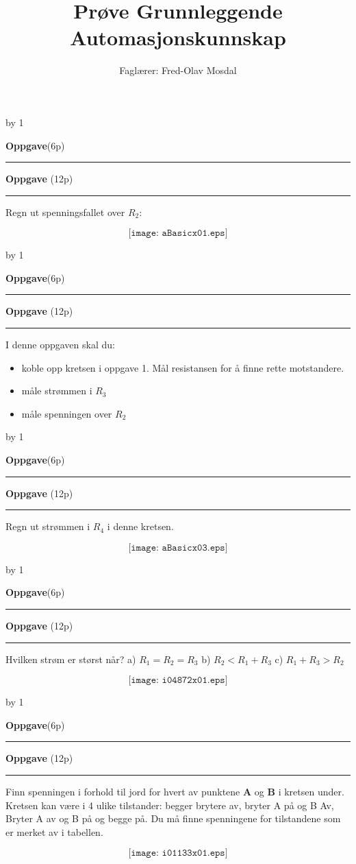 \documentclass[12pt,a4paper]{article}
\def\oppgave{
            \advance\questnum by 1
	    \ifthenelse{\questnum>0\AND \questnum<9}
	    {
                \vskip 1cm
		\textbf{Oppgave}\hskip 5pt\the\questnum \hfill \hfill(6p)
		\vskip 3pt
		\hrule
	\vskip 0.5cm}
	{
                \vskip 1cm
		\textbf{Oppgave}\hskip 5pt \the\questnum \hfill \hfill(12p)
		\vskip 3pt \hrule \vskip 0.5cm }

		}
\begin{document}
\title{Prøve Grunnleggende Automasjonskunnskap}
\author{Faglærer: Fred-Olav Mosdal\\}
\maketitle
\oppgave{}%
\vskip 2.5pt 
Regn ut spenningsfallet over $R_2$:

$$\texttt{[image: aBasicx01.eps]}$$
\vskip 2.5pt 

\vskip 2.5pt 

\vskip 2.5pt 
\newpage
\oppgave{}%
\vskip 2.5pt 
I denne oppgaven skal du:
\begin{itemize}
	\item koble opp kretsen i oppgave 1. Mål resistansen for å finne rette motstandere. 
	\item måle strømmen i $R_3$
	\item måle spenningen over $R_2$
\end{itemize}
\vskip 2.5pt 
\newpage
\oppgave{}%
\vskip 2.5pt 
Regn ut strømmen i $R_4$ i denne kretsen. 

$$\texttt{[image: aBasicx03.eps]}$$

\vskip 2.5pt 

\vskip 2.5pt 
\newpage


\oppgave{}%
\vskip 2.5pt 
Hvilken strøm er størst når?
\vskip 10pt
a) $R_1=R_2=R_3$
\vskip 10pt
b) $R_2<R_1 + R_3$
\vskip 10pt
c) $R_1+R_3>R_2$
\vskip 10pt

$$\texttt{[image: i04872x01.eps]}$$

\vskip 5pt 
\vskip 2.5pt 
\newpage
\oppgave{}%
\vskip 2.5pt 
Finn spenningen i forhold til jord for hvert av punktene \textbf{A} og \textbf{B} i kretsen under. 
Kretsen kan være i 4 ulike tilstander: begger brytere av, bryter A på og B Av, Bryter A av og B på og begge på. Du må finne spenningene for tilstandene som er merket av i tabellen. 

$$\texttt{[image: i01133x01.eps]}$$
\end{document}
